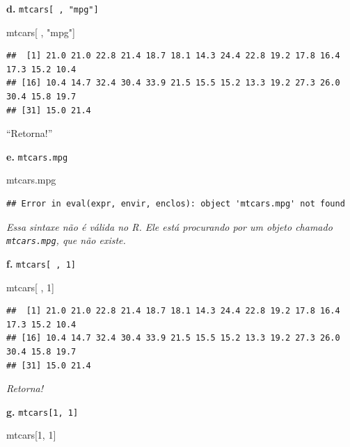 \documentclass[
]{book}
\newenvironment{Shaded}{\begin{snugshade}}{\end{snugshade}}
\newcommand{\DecValTok}[1]{\textcolor[rgb]{0.00,0.00,0.81}{#1}}
\newcommand{\NormalTok}[1]{#1}
\newcommand{\StringTok}[1]{\textcolor[rgb]{0.31,0.60,0.02}{#1}}
\begin{document}
\textbf{d.} \texttt{mtcars{[}\ ,\ "mpg"{]}}

\begin{Shaded}
\begin{Highlighting}[]
\NormalTok{mtcars[ , }\StringTok{"mpg"}\NormalTok{]}
\end{Highlighting}
\end{Shaded}

\begin{verbatim}
##  [1] 21.0 21.0 22.8 21.4 18.7 18.1 14.3 24.4 22.8 19.2 17.8 16.4 17.3 15.2 10.4
## [16] 10.4 14.7 32.4 30.4 33.9 21.5 15.5 15.2 13.3 19.2 27.3 26.0 30.4 15.8 19.7
## [31] 15.0 21.4
\end{verbatim}

``Retorna!''

\textbf{e.} \texttt{mtcars.mpg}

\begin{Shaded}
\begin{Highlighting}[]
\NormalTok{mtcars.mpg}
\end{Highlighting}
\end{Shaded}

\begin{verbatim}
## Error in eval(expr, envir, enclos): object 'mtcars.mpg' not found
\end{verbatim}

\emph{Essa sintaxe não é válida no R. Ele está procurando por um objeto chamado \texttt{mtcars.mpg}, que não existe.}

\textbf{f.} \texttt{mtcars{[}\ ,\ 1{]}}

\begin{Shaded}
\begin{Highlighting}[]
\NormalTok{mtcars[ , }\DecValTok{1}\NormalTok{]}
\end{Highlighting}
\end{Shaded}

\begin{verbatim}
##  [1] 21.0 21.0 22.8 21.4 18.7 18.1 14.3 24.4 22.8 19.2 17.8 16.4 17.3 15.2 10.4
## [16] 10.4 14.7 32.4 30.4 33.9 21.5 15.5 15.2 13.3 19.2 27.3 26.0 30.4 15.8 19.7
## [31] 15.0 21.4
\end{verbatim}

\emph{Retorna!}

\textbf{g.} \texttt{mtcars{[}1,\ 1{]}}

\begin{Shaded}
\begin{Highlighting}[]
\NormalTok{mtcars[}\DecValTok{1}\NormalTok{, }\DecValTok{1}\NormalTok{]}
\end{Highlighting}
\end{Shaded}
\end{document}
